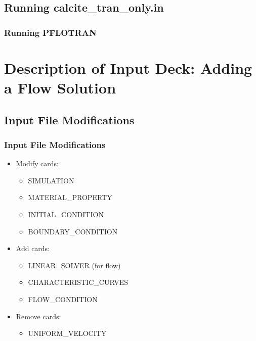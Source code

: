 \documentclass{beamer}
\begin{document}
\subsection{Running calcite_tran_only.in}

\begin{frame}[fragile]\frametitle{Running PFLOTRAN}


\end{frame}

\section{Description of Input Deck: Adding a Flow Solution}

\subsection{Input File Modifications}

\begin{frame}[fragile]\frametitle{Input File Modifications}

\begin{itemize}
\item Modify cards:
  \begin{itemize}
    \item SIMULATION
    \item MATERIAL\_PROPERTY
    \item INITIAL\_CONDITION
    \item BOUNDARY\_CONDITION
   \end{itemize}
\item Add cards:
  \begin{itemize}
    \item LINEAR\_SOLVER (for flow)
    \item CHARACTERISTIC\_CURVES
    \item FLOW\_CONDITION
  \end{itemize}
\item Remove cards:
  \begin{itemize}
    \item UNIFORM\_VELOCITY
  \end{itemize}
\end{itemize}

\end{frame}
\end{document}
